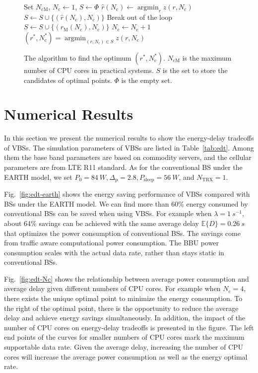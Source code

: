 \documentclass[conference]{IEEEtran}
\newcommand{\E}[1]{\mathbb{E}\{#1\}}
\newcommand{\argmin}{\operatorname{argmin}}
\begin{document}
\begin{figure}[!t]
  \centering
  \begin{algorithmic}[1]
    \STATE Set $N_\text{cM}$, $N_\text{c} \leftarrow 1$, $S \leftarrow \Phi$
    \STATE $\hat{r}(N_\text{c}) \leftarrow \argmin_{r} z(r, N_\text{c})$
    \STATE $S \leftarrow S \cup \{(\hat{r}(N_\text{c}), N_\text{c})\}$
    \STATE Break out of the loop
    \ELSE
    \STATE $S \leftarrow S \cup \{(r_\text{M}(N_\text{c}), N_\text{c})\}$
    \STATE $N_\text{c} \leftarrow N_\text{c} + 1$
    \ENDIF
    \ENDWHILE
    \RETURN $(r^*, N_\text{c}^*) = \argmin_{(r, N_\text{c}) \in S} z(r, N_\text{c})$
  \end{algorithmic}
  \caption{The algorithm to find the optimum $(r^*, N_\text{c}^*)$.
  $N_\text{cM}$ is the maximum number of CPU cores in practical systems.
  $S$ is the set to store the candidates of optimal points.
  $\Phi$ is the empty set.}
  \label{fig:alg-pair}
\end{figure}

\section{Numerical Results}
\label{sec:num}

In this section we present the
numerical results to show the energy-delay tradeoffs of VBSs.
The simulation parameters of VBSs are listed in Table~\ref{tab:edt}.
Among them the base band parameters are based on commodity servers, and
the cellular parameters are from LTE R11 standard.
As for the conventional BS under the EARTH model, we set
$P_0 = \SI{84}{W}, \Delta_\text{p} = 2.8, P_\text{sleep} = \SI{56}{W}$,
and $N_\text{TRX} = 1$.

Fig.~\ref{fig:edt-earth} shows the energy saving performance of VBSs
compared with BSs under the EARTH model. We can find more than 60\% energy
consumed by conventional BSs can be saved when using VBSs. For example
when $\lambda = \SI{1}{s^{-1}}$,
about 64\% savings can be achieved with the same average delay $\E{D}=\SI{0.26}{s}$
that optimizes the power consumption of conventional BSs.
The savings come from traffic aware computational power consumption.
The BBU power consumption scales with the actual data rate, rather than stays
static in conventional BSs.

Fig.~\ref{fig:edt-Nc} shows the relationship between average power consumption
and average delay given different numbers of CPU cores.
For example when $N_\text{c} = 4$,
there exists the unique optimal point to minimize the energy consumption.
To the right of the optimal point, there is the
opportunity to reduce the average delay and achieve energy savings
simultaneously.
In addition, the impact of the number of CPU cores on energy-delay tradeoffs is
presented in the figure.
The left end points of the curves for smaller numbers of CPU cores mark the maximum
supportable data rate.
Given the average delay, increasing the number of
CPU cores will increase the average power consumption as well as the energy
optimal rate.
\end{document}

